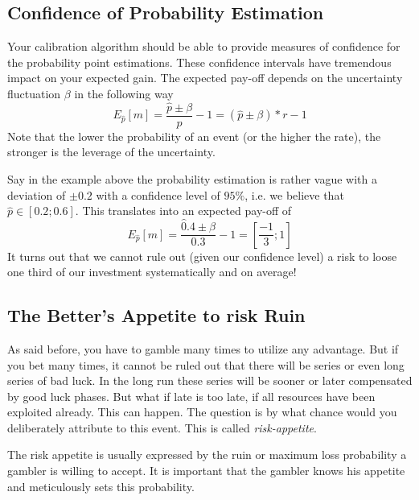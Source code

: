 \documentclass{article}
\begin{document}
\subsection{Confidence of Probability Estimation}
Your calibration algorithm should be able to provide measures of confidence for the probability point estimations. These confidence intervals have tremendous impact on your expected gain. The expected pay-off depends on the uncertainty fluctuation $\beta$ in the following way
\begin{equation}\label{eq:expectation3}
   E_{\hat p} [m] = \frac {\hat p \pm \beta}{p} - 1 = (\hat p \pm \beta) *  r -1
\end{equation}
Note that the lower the probability of an event (or the higher the rate), the stronger is the leverage of the uncertainty.

Say in the example above the probability estimation is rather vague with a deviation of $\pm 0.2$ with a confidence level of $95\%$, i.e. we believe that $\hat p \in [0.2;0.6]$. This translates into an expected pay-off of
\begin{equation}
E_{\hat p} [m] = \frac {\hat 0.4 \pm \beta}{0.3} - 1 = [\frac{-1}3; 1]
\end{equation}
It turns out that we cannot rule out (given our confidence level) a risk to loose one third of our investment systematically and on average! 

\subsection{The Better's Appetite to risk Ruin}
As said before, you have to gamble many times to utilize any advantage. But if you bet many times, it cannot be ruled out that there will be series or even long series of bad luck. In the long run these series will be sooner or later compensated by good luck phases. But what if late is too late, if all resources have been exploited already. This can happen. The question is by what chance would you deliberately attribute to this event. This is called \emph{risk-appetite}.

The risk appetite is usually expressed by the ruin or maximum loss probability a gambler is willing to accept. It is important that the gambler knows his appetite and meticulously sets this probability.
\end{document}
